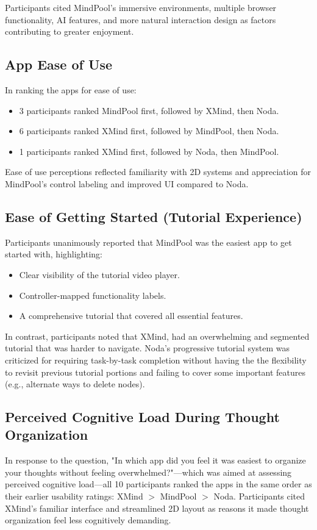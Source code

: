 \documentclass{CPP}
\begin{document}
Participants cited MindPool's immersive environments, multiple browser functionality, AI features, and more natural interaction design as factors contributing to greater enjoyment.

\subsection{App Ease of Use}
In ranking the apps for ease of use:

\begin{itemize}
    \item 3 participants ranked MindPool first, followed by XMind, then Noda.
    \item 6 participants ranked XMind first, followed by MindPool, then Noda.
    \item 1 participants ranked XMind first, followed by Noda, then MindPool.
\end{itemize}

Ease of use perceptions reflected familiarity with 2D systems and appreciation for MindPool’s control labeling and improved UI compared to Noda.

\subsection{Ease of Getting Started (Tutorial Experience)}
Participants unanimously reported that MindPool was the easiest app to get started with, highlighting:
\begin{itemize}
    \item Clear visibility of the tutorial video player.
    \item Controller-mapped functionality labels.
    \item A comprehensive tutorial that covered all essential features.
\end{itemize}
In contrast, participants noted that XMind, had an overwhelming and segmented tutorial that was harder to navigate. Noda's progressive tutorial system was criticized for requiring task-by-task completion without having the the flexibility to revisit previous tutorial portions and failing to cover some important features (e.g., alternate ways to delete nodes).

\subsection{Perceived Cognitive Load During Thought Organization}

In response to the question, "In which app did you feel it was easiest to organize your thoughts without feeling overwhelmed?"—which was aimed at assessing perceived cognitive load—all 10 participants ranked the apps in the same order as their earlier usability ratings:
XMind $>$ MindPool $>$ Noda.
Participants cited XMind’s familiar interface and streamlined 2D layout as reasons it made thought organization feel less cognitively demanding.
\end{document}
